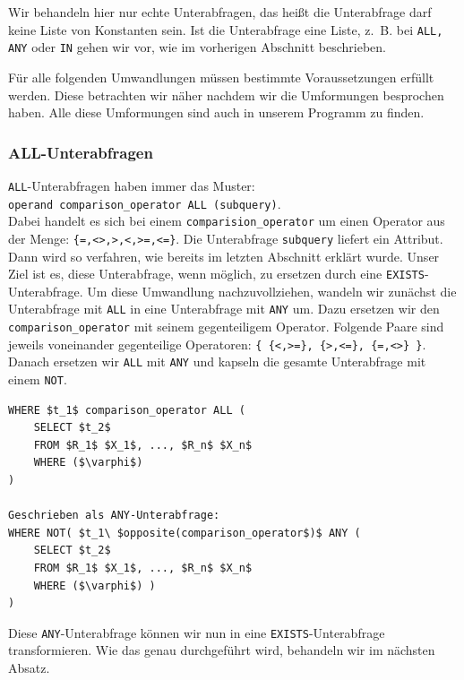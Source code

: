 Wir behandeln hier nur echte Unterabfragen, das heißt die Unterabfrage darf keine Liste von Konstanten sein. Ist die Unterabfrage eine Liste, \mbox{z. B.} bei \verb|ALL, ANY| oder \verb|IN| gehen wir vor, wie im vorherigen Abschnitt beschrieben.

Für alle folgenden Umwandlungen müssen bestimmte Voraussetzungen erfüllt werden. Diese betrachten wir näher nachdem wir die Umformungen besprochen haben. Alle diese Umformungen sind auch in unserem Programm zu finden.

\subsubsection*{ALL-Unterabfragen}

\verb|ALL|-Unterabfragen haben immer das Muster:\\ \verb|operand comparison_operator ALL (subquery)|.\\ Dabei handelt es sich bei einem \verb|comparision_operator| um einen Operator aus der Menge: \verb|{=,<>,>,<,>=,<=}|. Die Unterabfrage \verb|subquery| liefert ein Attribut. Dann wird so verfahren, wie bereits im letzten Abschnitt erklärt wurde. Unser Ziel ist es, diese Unterabfrage, wenn möglich, zu ersetzen durch eine \verb|EXISTS|-Unterabfrage. Um diese Umwandlung nachzuvollziehen, wandeln wir zunächst die Unterabfrage mit \verb|ALL| in eine Unterabfrage mit \verb|ANY| um. Dazu ersetzen wir den \verb|comparison_operator| mit seinem gegenteiligem Operator. Folgende Paare sind jeweils voneinander gegenteilige Operatoren: \verb|{ {<,>=}, {>,<=}, {=,<>} }|. Danach ersetzen wir \verb|ALL| mit \verb|ANY| und kapseln die gesamte Unterabfrage mit einem \verb|NOT|. \newpage

\begin{lstlisting}[mathescape]
WHERE $t_1$ comparison_operator ALL (
	SELECT $t_2$
	FROM $R_1$ $X_1$, ..., $R_n$ $X_n$
	WHERE ($\varphi$)
)

Geschrieben als ANY-Unterabfrage:
WHERE NOT( $t_1\ $opposite(comparison_operator$)$ ANY (
	SELECT $t_2$
	FROM $R_1$ $X_1$, ..., $R_n$ $X_n$
	WHERE ($\varphi$) ) 
)
\end{lstlisting}

Diese \verb|ANY|-Unterabfrage können wir nun in eine \verb|EXISTS|-Unterabfrage transformieren. Wie das genau durchgeführt wird, behandeln wir im nächsten Absatz.


